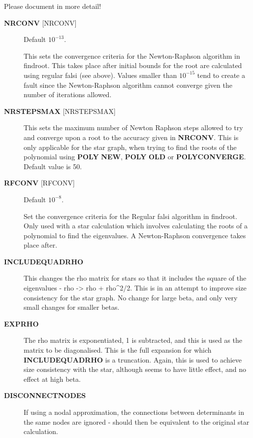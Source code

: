 \documentclass[openany,a4paper,10pt]{manual}
\begin{document}
\begin{notice}[note]
Please document in more detail!
\end{notice}
\begin{description}
\item[\textbf{NRCONV} {[}NRCONV{]}]
Default $10^{-13}$.

This sets the convergence criteria for the Newton-Raphson algorithm
in findroot. This takes place after initial bounds for the root are
calculated using regular falsi (see above). Values smaller than
$10^{-15}$ tend to create a fault since the Newton-Raphson
algorithm cannot converge given the number of iterations allowed.

\item[\textbf{NRSTEPSMAX} {[}NRSTEPSMAX{]}]
This sets the maximum number of Newton Raphson steps allowed to try
and converge upon a root to the accuracy given in \textbf{NRCONV}. This
is only applicable for the star graph, when trying to find
the roots of the polynomial using \textbf{POLY} \textbf{NEW}, \textbf{POLY} \textbf{OLD} or
\textbf{POLYCONVERGE}. Default value is 50.

\item[\textbf{RFCONV} {[}RFCONV{]}]
Default $10^{-8}$.

Set the convergence criteria for the Regular falsi algorithm in
findroot. Only used with a star calculation which involves calculating
the roots of a polynomial to find the eigenvalues. A Newton-Raphson
convergence takes place after.

\item[\textbf{INCLUDEQUADRHO}]
This changes the rho matrix for stars so that it includes the square
of the eigenvalues - rho -\textgreater{} rho + rho\textasciicircum{}2/2. This is in an attempt to
improve size consistency for the star graph. No change for large beta,
and only very small changes for smaller betas.

\item[\textbf{EXPRHO}]
The rho matrix is exponentiated, 1 is subtracted, and this is used as
the matrix to be diagonalised. This is the full expansion for which
\textbf{INCLUDEQUADRHO} is a truncation. Again, this is used to achieve
size consistency with the star, although seems to have little effect,
and no effect at high beta.

\item[\textbf{DISCONNECTNODES}]
If using a nodal approximation, the connections between determinants
in the same nodes are ignored - should then be equivalent to the
original star calculation.


\end{description}
\end{document}
